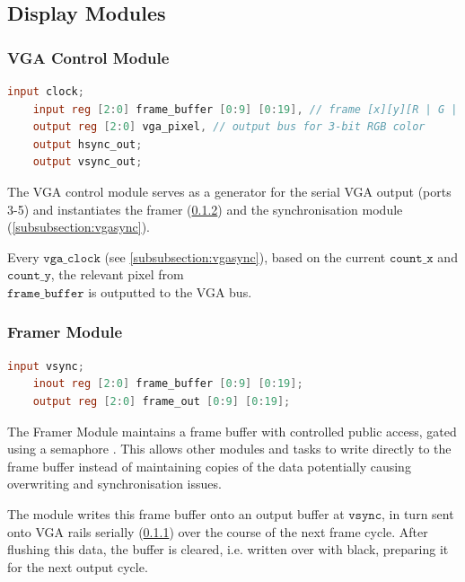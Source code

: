 \subsection{Display Modules}
\label{subsection:display}

\subsubsection{VGA Control Module}
\label{subsubsection:vgacontrol}
%
\begin{lstlisting}[language=Verilog]
    input clock;
    input reg [2:0] frame_buffer [0:9] [0:19], // frame [x][y][R | G | B]
    output reg [2:0] vga_pixel, // output bus for 3-bit RGB color
    output hsync_out;
    output vsync_out;
\end{lstlisting}

The VGA control module serves as a generator for the serial VGA output 
(ports 3-5) and instantiates the framer (\ref{subsubsection:framer}) and
the synchronisation module (\ref{subsubsection:vgasync}).

Every \(\texttt{vga\_clock}\) (see \ref{subsubsection:vgasync}), based on the
current \(\texttt{count\_x}\) and \(\texttt{count\_y}\), the relevant pixel from \\
\(\texttt{frame\_buffer}\) is outputted to the VGA bus.\\
 

\subsubsection{Framer Module}
\label{subsubsection:framer}
%
\begin{lstlisting}[language=Verilog]
    input vsync;
    inout reg [2:0] frame_buffer [0:9] [0:19];
    output reg [2:0] frame_out [0:9] [0:19];
\end{lstlisting}

The Framer Module maintains a frame buffer with controlled public access,
gated using a semaphore \cite{semaphore}. This allows other modules and tasks 
to write directly to the frame buffer instead of maintaining copies of the data 
potentially causing overwriting and synchronisation issues.

The module writes this frame buffer onto an output buffer at \(\texttt{vsync}\), 
in turn sent onto VGA rails serially (\ref{subsubsection:vgacontrol})
over the course of the next frame cycle. After flushing this data, the buffer is cleared,
i.e. written over with black, preparing it for the next output cycle.\\

